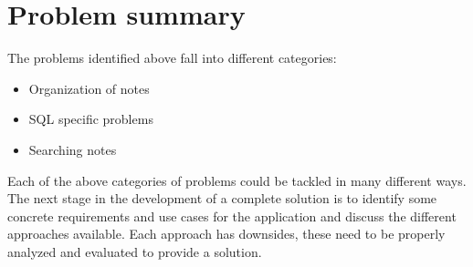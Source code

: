 \section{Problem summary}\label{summary-of-identified-problems}

The problems identified above fall into different categories:

\begin{itemize}
\tightlist
\item
  Organization of notes
\item
  SQL specific problems
\item
  Searching notes
\end{itemize}

Each of the above categories of problems could be tackled in many different
ways. The next stage in the development of a complete solution is to identify
some concrete requirements and use cases for the application and discuss the
different approaches available. Each approach has downsides, these need to be
properly analyzed and evaluated to provide a solution.
